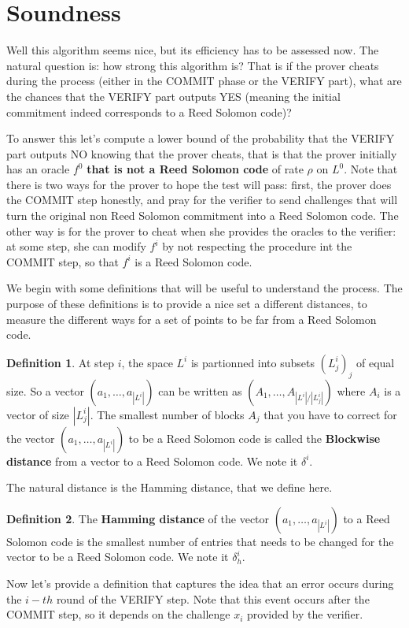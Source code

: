 \documentclass[12pt]{extarticle}
\newcommand{\<}{\langle}
\renewcommand{\>}{\rangle}
\theoremstyle{definition}
\newtheorem{defn}{Definition}
\begin{document}
\section{Soundness}

Well this algorithm seems nice, but its efficiency has to be assessed now. The natural question is: how strong this algorithm is? That is if the prover cheats during the process (either in the COMMIT phase or the VERIFY part), what are the chances that the VERIFY part outputs YES (meaning the initial commitment indeed corresponds to a Reed Solomon code)?

To answer this let's compute a lower bound of the probability that the VERIFY part outputs NO knowing that the prover cheats, that is that the prover initially has an oracle $f^0$ \textbf{that is not a Reed Solomon code} of rate $\rho$ on $L^0$. Note that there is two ways for the prover to hope the test will pass: first, the prover does the COMMIT step honestly, and pray for the verifier to send challenges that will turn the original non Reed Solomon commitment into a Reed Solomon code. The other way is for the prover to cheat when she provides the oracles to the verifier: at some step, she can modify $f^i$ by not respecting the procedure int the COMMIT step, so that $f^i$ is a Reed Solomon code.

We begin with some definitions that will be useful to understand the process. The purpose of these definitions is to provide a nice set a different distances, to measure the different ways for a set of points to be far from a Reed Solomon code.
\begin{defn}
At step $i$, the space $L^i$ is partionned into subsets $(L^i_j)_j$ of equal size. So a vector $(a_1,\dots,a_{|L^i|})$ can be written as $(A_1,\dots,A_{|L^i|/|L^i_j|})$ where $A_i$ is a vector of size $|L^i_j|$. The smallest number of blocks $A_j$ that you have to correct for the vector $(a_1,\dots,a_{|L^i|})$ to be a Reed Solomon code is called the \textbf{Blockwise distance} from a vector to a Reed Solomon code. We note it $\delta^i$.
\end{defn}
The natural distance is the Hamming distance, that we define here.
\begin{defn}
The \textbf{Hamming distance} of the vector $(a_1,\dots,a_{|L^i|})$ to a Reed Solomon code is the smallest number of entries that needs to be changed for the vector to be a Reed Solomon code. We note it $\delta_h^i$.
\end{defn}
Now let's provide a definition that captures the idea that an error occurs during the $i-th$ round of the VERIFY step. Note that this event occurs after the COMMIT step, so it depends on the challenge $x_i$ provided by the verifier.
\end{document}
